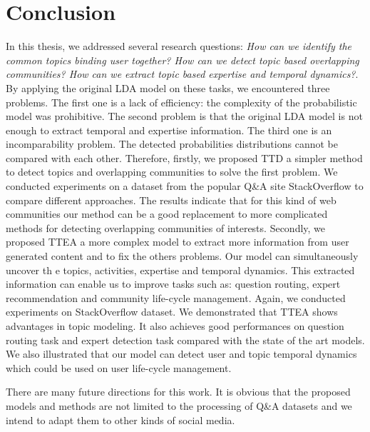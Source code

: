 \chapter{Conclusion}
\doublespacing
\label{chap:intro}
\minitoc



In this thesis, we addressed several research questions: \textit{How can we identify the common topics binding user together? How can we detect topic based overlapping communities? How can we extract topic based expertise and temporal dynamics?}. By applying the original  LDA model on these tasks, we encountered three problems. The first one is a lack of efficiency: the complexity of the probabilistic model was prohibitive. The second problem is that the original LDA model is not enough to extract temporal and expertise information. The third one is an incomparability problem. The detected probabilities distributions cannot be compared with each other. 
Therefore, firstly, we proposed TTD a simpler method to detect topics and overlapping communities to solve the first problem. We conducted experiments on a dataset from the popular Q\&A site StackOverflow to compare different approaches. The results indicate that for this kind of web communities our method can be a good replacement to more complicated methods for detecting overlapping communities of interests.
Secondly, we proposed TTEA a more complex model to extract more information from user generated content and to fix the others problems. Our model can simultaneously uncover th
e topics, activities, expertise and temporal dynamics. This extracted information can enable us to improve tasks such as: question routing, expert recommendation and community life-cycle management. Again, we conducted experiments on StackOverflow dataset. We demonstrated that TTEA shows advantages in topic modeling. It also achieves good performances on question routing task and expert detection task compared with the state of the art models. We also illustrated that our model can detect user and topic temporal dynamics which could be used on user life-cycle management.

There are many future directions for this work. It is obvious that the proposed models and methods are not limited to the processing of Q\&A datasets and we intend to adapt them to other kinds of social media.